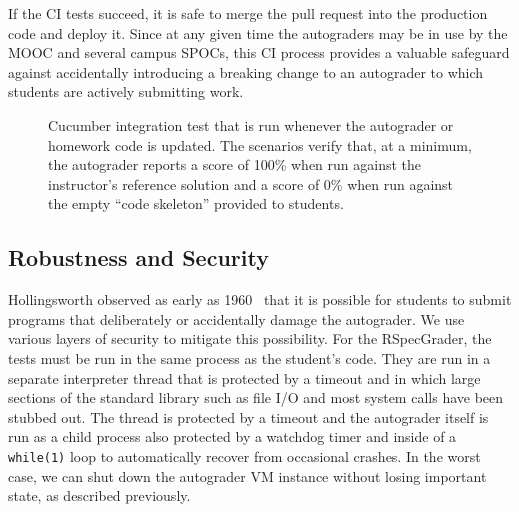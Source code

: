 If the CI tests succeed, it is safe to merge the pull request into the
production code and deploy it.  Since at any given time the autograders
may be in use by the MOOC and several campus SPOCs,
this CI process provides a valuable safeguard
against accidentally introducing a breaking change to an autograder to
which students are actively submitting work.


\begin{figure}
  \centering
  \caption{\label{fig:rag-ci}%
  Cucumber integration test that is run whenever the autograder or
  homework code is updated.  The scenarios verify that, at a minimum,
  the autograder reports a score of 100\% when run against the
  instructor's reference solution and a score of 0\% when run against
  the empty ``code skeleton'' provided to students.  
}
\end{figure}


\subsection{Robustness and Security}

Hollingsworth observed as early as 1960~\cite{hollingsworth60} that it
is possible for students 
to submit programs that deliberately or accidentally damage the autograder. 
We use various layers of security to mitigate this possibility.
For the RSpecGrader, the tests must be run in the same
process as the student's code.  They are run in a separate interpreter
thread that is protected by a timeout and in which large sections of the
standard library such as file I/O and most system calls have been
stubbed out.  The thread is protected by a timeout and the autograder
itself is run as a child process also protected by a watchdog timer and
inside of a \texttt{while(1)} loop to automatically recover from
occasional crashes.  In the worst case, we can shut down the autograder
VM instance without losing important state, as described previously.
 

